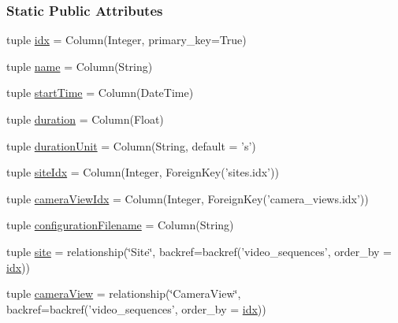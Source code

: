 \subsubsection*{Static Public Attributes}
\begin{DoxyCompactItemize}
\item 
tuple \hyperlink{classmetadata_1_1VideoSequence_a0844101c5168bf30f9e9dbfd9f4065e2}{idx} = Column(Integer, primary\-\_\-key=True)
\item 
tuple \hyperlink{classmetadata_1_1VideoSequence_a3450963b578810730f9744728c1cd273}{name} = Column(String)
\item 
tuple \hyperlink{classmetadata_1_1VideoSequence_a3ba5bdc6a67b7f7e76ce019107de464d}{start\-Time} = Column(Date\-Time)
\item 
tuple \hyperlink{classmetadata_1_1VideoSequence_a0b9d9c3346ccfad67554ff2dbc346ed1}{duration} = Column(Float)
\item 
tuple \hyperlink{classmetadata_1_1VideoSequence_a55019c9b3be7631cd8ea509541782144}{duration\-Unit} = Column(String, default = 's')
\item 
tuple \hyperlink{classmetadata_1_1VideoSequence_acb8442e0489a76a70519fc2b765237fc}{site\-Idx} = Column(Integer, Foreign\-Key('sites.\-idx'))
\item 
tuple \hyperlink{classmetadata_1_1VideoSequence_aaa1608c6a957289ec399e995d082b616}{camera\-View\-Idx} = Column(Integer, Foreign\-Key('camera\-\_\-views.\-idx'))
\item 
tuple \hyperlink{classmetadata_1_1VideoSequence_a5c35f48c9567f8bff79677448e018aac}{configuration\-Filename} = Column(String)
\item 
tuple \hyperlink{classmetadata_1_1VideoSequence_a1273890c04652050ca51739eae489640}{site} = relationship(\char`\"{}Site\char`\"{}, backref=backref('video\-\_\-sequences', order\-\_\-by = \hyperlink{classmetadata_1_1VideoSequence_a0844101c5168bf30f9e9dbfd9f4065e2}{idx}))
\item 
tuple \hyperlink{classmetadata_1_1VideoSequence_a78803fa800420a7594cc5c0f03f590b2}{camera\-View} = relationship(\char`\"{}Camera\-View\char`\"{}, backref=backref('video\-\_\-sequences', order\-\_\-by = \hyperlink{classmetadata_1_1VideoSequence_a0844101c5168bf30f9e9dbfd9f4065e2}{idx}))
\end{DoxyCompactItemize}


